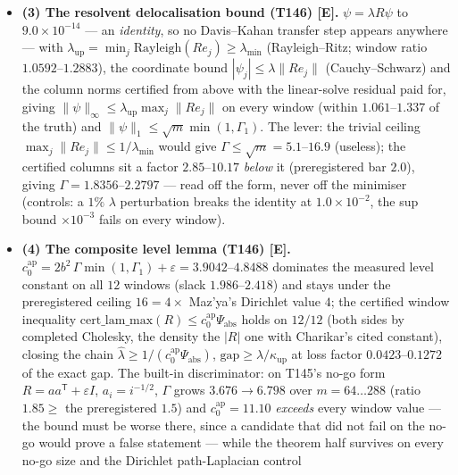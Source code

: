 \documentclass[11pt]{article}
\providecommand{\mE}{\textbf{[E]}}\providecommand{\mC}{\textbf{[C]}}
\begin{document}
\begin{itemize}[leftmargin=1.5em]
the chain consumes only the lower domination $|v|\le\psi_t$ --- the a-priori constant gains
$4/b_*^2=3.7612$ over base $2$ on every window (controls: the bound $\times10^{-3}$ fails on every
draw and base, and the one-level-down cake breaks the domination on every draw --- the $+1$ in the
cake exponent is load-bearing).
\item \textbf{(3) The resolvent delocalisation bound (T146) \mE.} $\psi=\lambda R\psi$ to
$9.0\times10^{-14}$ --- an \emph{identity}, so no Davis--Kahan transfer step appears anywhere ---
with $\lambda_{\mathrm{up}}=\min_j\mathrm{Rayleigh}(Re_j)\ge\lambda_{\min}$ (Rayleigh--Ritz; window
ratio $1.0592$--$1.2883$), the coordinate bound $|\psi_j|\le\lambda\|Re_j\|$ (Cauchy--Schwarz) and
the column norms certified from above with the linear-solve residual paid for, giving
$\|\psi\|_\infty\le\lambda_{\mathrm{up}}\max_j\|Re_j\|$ on every window (within
$1.061$--$1.337$ of the truth) and $\|\psi\|_1\le\sqrt m\min(1,\Gamma_1)$. The lever: the trivial
ceiling $\max_j\|Re_j\|\le1/\lambda_{\min}$ would give $\Gamma\le\sqrt m=5.1$--$16.9$ (useless);
the certified columns sit a factor $2.85$--$10.17$ \emph{below} it (preregistered bar $2.0$),
giving $\Gamma=1.8356$--$2.2797$ --- read off the form, never off the minimiser (controls: a $1\%$
$\lambda$ perturbation breaks the identity at $1.0\times10^{-2}$, the sup bound $\times10^{-3}$
fails on every window).
\item \textbf{(4) The composite level lemma (T146) \mE.}
$c_0^{\mathrm{ap}}=2b^2\,\Gamma\min(1,\Gamma_1)+\varepsilon=3.9042$--$4.8488$ dominates the
measured level constant on all $12$ windows (slack $1.986$--$2.418$) and stays under the
preregistered ceiling $16=4\times$ Maz'ya's Dirichlet value $4$; the certified window inequality
$\mathrm{cert\_lam\_max}(R)\le c_0^{\mathrm{ap}}\Psi_{\mathrm{abs}}$ holds on $12/12$ (both sides
by completed Cholesky, the density the $|R|$ one with Charikar's cited constant), closing the chain
$\hat\lambda\ge1/(c_0^{\mathrm{ap}}\Psi_{\mathrm{abs}})$,
$\mathrm{gap}\ge\hat\lambda/\kappa_{\mathrm{up}}$ at loss factor $0.0423$--$0.1272$ of the exact
gap. The built-in discriminator: on T145's no-go form $R=aa^{\mathsf T}+\varepsilon I$,
$a_i=i^{-1/2}$, $\Gamma$ grows $3.676\to6.798$ over $m=64\ldots288$ (ratio $1.85\ge$ the
preregistered $1.5$) and $c_0^{\mathrm{ap}}=11.10$ \emph{exceeds} every window value --- the bound
must be worse there, since a candidate that did not fail on the no-go would prove a false statement
--- while the theorem half survives on every no-go size and the Dirichlet path-Laplacian control

\end{itemize}
\end{document}
